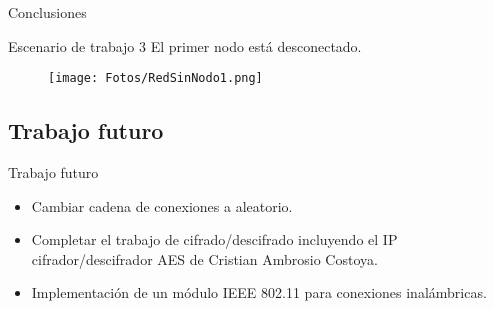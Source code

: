 \documentclass[aspectratio=169]{beamer}
\begin{document}
\begin{frame}{Conclusiones}
\begin{block}{Escenario de trabajo 3}
	El primer nodo está desconectado.
	\begin{figure}[h]
		\centering
		\texttt{[image: Fotos/RedSinNodo1.png]}
	\end{figure}
\end{block}
\end{frame}

\subsection{Trabajo futuro}
\begin{frame}{Trabajo futuro}
\begin{itemize}
	\item Cambiar cadena de conexiones a aleatorio.
	\item Completar el trabajo de cifrado/descifrado incluyendo el IP cifrador/descifrador AES de Cristian Ambrosio Costoya.
	\item Implementación de un módulo IEEE 802.11 para conexiones inalámbricas.
\end{itemize}
\end{frame}
\end{document}
